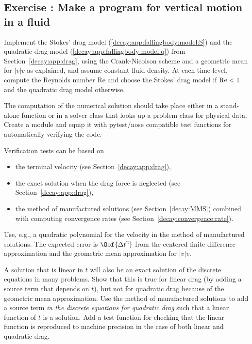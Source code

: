 \documentclass[graybox,sectrefs,envcountresetchap,open=right,final]{svmonodo}
\newenvironment{doconceexercise}{}{}
\newcounter{doconceexercisecounter}
\begin{document}
\begin{doconceexercise}

\subsection*{Exercise \thedoconceexercisecounter: Make a program for vertical motion in a fluid}

\label{decay:app:exer:drag:prog}

Implement the Stokes' drag model (\ref{decay:app:fallingbody:model:S})
and the quadratic drag model (\ref{decay:app:fallingbody:model:q}) from
Section~\ref{decay:app:drag}, using the Crank-Nicolson
scheme and a geometric mean for $|v|v$ as explained, and assume
constant fluid density.
At each time level, compute the Reynolds number
Re and choose the Stokes' drag model if $\hbox{Re} < 1$ and the
quadratic drag model otherwise.

The computation of the numerical solution should take place either in
a stand-alone function or in a solver class that looks up a problem
class for physical data. Create a module and equip it with pytest/nose
compatible test functions for automatically verifying the code.

Verification tests can be based on

\begin{itemize}
 \item the terminal velocity (see Section~\ref{decay:app:drag}),

 \item the exact solution when the drag force is neglected
   (see Section~\ref{decay:app:drag}),

 \item the method of manufactured solutions (see Section~\ref{decay:MMS})
   combined with computing
   convergence rates (see Section~\ref{decay:convergence:rate}).
\end{itemize}

\noindent
Use, e.g., a quadratic polynomial for the velocity in the method of
manufactured solutions. The expected error is $\Oof{\Delta t^2}$
from the centered finite difference approximation and the geometric
mean approximation for $|v|v$.

A solution that is linear in $t$ will also be an exact solution of the
discrete equations in many problems.  Show that this is true for
linear drag (by adding a source term that depends on $t$), but not
for quadratic drag because of the geometric mean approximation.  Use
the method of manufactured solutions to add a source term \emph{in the
discrete equations for quadratic drag} such that a linear function of
$t$ is a solution. Add a test function for checking that the linear
function is reproduced to machine precision in the case of both linear
and quadratic drag.


\end{doconceexercise}
\end{document}
